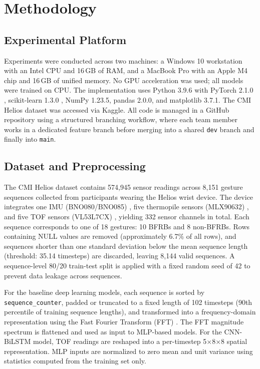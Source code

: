 \documentclass[conference]{IEEEtran}
\begin{document}
\clearpage


\newpage
\section{Methodology}
\label{sec:methodology}

\subsection{Experimental Platform}

Experiments were conducted across two machines: a Windows 10 workstation with an Intel CPU and 16\,GB of RAM, and a MacBook Pro with an Apple M4 chip and 16\,GB of unified memory. No GPU acceleration was used; all models were trained on CPU. The implementation uses Python 3.9.6 with PyTorch 2.1.0 \cite{pytorch2019}, scikit-learn 1.3.0 \cite{scikit2025api}, NumPy 1.23.5, pandas 2.0.0, and matplotlib 3.7.1. The CMI Helios dataset \cite{newman2025cmi} was accessed via Kaggle. All code is managed in a GitHub repository using a structured branching workflow, where each team member works in a dedicated feature branch before merging into a shared \texttt{dev} branch and finally into \texttt{main}.

\subsection{Dataset and Preprocessing}

The CMI Helios dataset \cite{newman2025cmi} contains 574,945 sensor readings across 8,151 gesture sequences collected from participants wearing the Helios wrist device. The device integrates one IMU (BNO080/BNO085) \cite{ceva2019bno}, five thermopile sensors (MLX90632) \cite{melexis2023mlx}, and five TOF sensors (VL53L7CX) \cite{st2024vl53}, yielding 332 sensor channels in total. Each sequence corresponds to one of 18 gestures: 10 BFRBs and 8 non-BFRBs. Rows containing NULL values are removed (approximately 6.7\% of all rows), and sequences shorter than one standard deviation below the mean sequence length (threshold: 35.14 timesteps) are discarded, leaving 8,144 valid sequences. A sequence-level 80/20 train-test split is applied with a fixed random seed of 42 to prevent data leakage across sequences.

For the baseline deep learning models, each sequence is sorted by \texttt{sequence\_counter}, padded or truncated to a fixed length of 102 timesteps (90th percentile of training sequence lengths), and transformed into a frequency-domain representation using the Fast Fourier Transform (FFT) \cite{cooley1965fft}. The FFT magnitude spectrum is flattened and used as input to MLP-based models. For the CNN-BiLSTM model, TOF readings are reshaped into a per-timestep 5$\times$8$\times$8 spatial representation. MLP inputs are normalized to zero mean and unit variance using statistics computed from the training set only.
\end{document}
